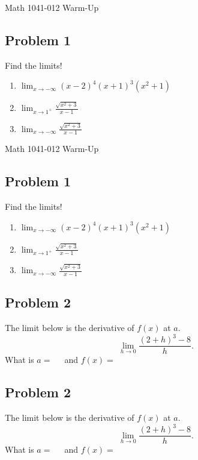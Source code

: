 \documentclass[10pt]{book}
\theoremstyle{definition}
\begin{document}
\begin{center}
{\Large Math 1041-012 \hspace{0.5cm} Warm-Up}
\end{center}
\subsection*{Problem 1} Find the limits!
\begin{enumerate}[label=(\alph*)]
    \item $\displaystyle\lim_{x\rightarrow-\infty}(x-2)^4(x+1)^3(x^2+1)$\vspace{2cm}
    \item $\displaystyle \lim_{x\rightarrow 1^+}\frac{\sqrt{x^2+3}}{x-1}$\vspace{2cm}
    \item $\displaystyle \lim_{x\rightarrow -\infty}\frac{\sqrt{x^2+3}}{x-1}$\vspace{2cm}
\end{enumerate}
\vspace{1cm}
\begin{center}
{\Large Math 1041-012 \hspace{0.5cm} Warm-Up}
\end{center}
\subsection*{Problem 1} Find the limits!
\begin{enumerate}[label=(\alph*)]
    \item $\displaystyle\lim_{x\rightarrow-\infty}(x-2)^4(x+1)^3(x^2+1)$\vspace{2cm}
    \item $\displaystyle \lim_{x\rightarrow 1^+}\frac{\sqrt{x^2+3}}{x-1}$\vspace{2cm}
    \item $\displaystyle \lim_{x\rightarrow -\infty}\frac{\sqrt{x^2+3}}{x-1}$\vspace{2cm}
\end{enumerate}
\clearpage
\subsection*{Problem 2} The limit below is the derivative of $f(x)$ at $a$.
\[
\lim_{h\rightarrow 0}\frac{(2+h)^3-8}{h}.
\]
What is $a=\ \ \ \ \ $ and $f(x)=\ \ \ \ \ $
\vspace{10cm}
\subsection*{Problem 2} The limit below is the derivative of $f(x)$ at $a$.
\[
\lim_{h\rightarrow 0}\frac{(2+h)^3-8}{h}.
\]
What is $a=\ \ \ \ \ $ and $f(x)=\ \ \ \ \ $
\end{document}
